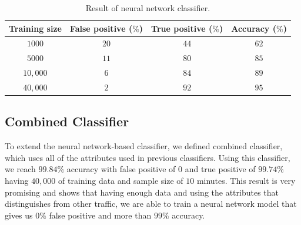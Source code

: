 \begin{table}
\center \caption{Result of neural network classifier.}\label{tab:nn}
\begin{tabular}{|c|c|c|c|}
\hline
 Training size& False positive ($\%$) &True positive ($\%$)&Accuracy ($\%$)\\
      \hline
	$1000$&$20$ &$44 $  & $62$\\
	$5000$&$11$& $80$  & $85$\\
	$10,000$&$6$& $84$  &$ 89$\\
	$40,000$&$2$& $92$   & $95$\\%

\hline
\end{tabular}
\end{table}



\subsection{Combined Classifier}
To extend the neural network-based classifier, we defined combined classifier, which uses all of the attributes used in previous classifiers. Using this classifier, we reach $99.84\%$ accuracy with false positive of $0$ and true positive of $99.74\%$ having $40,000$ of training data and sample size of $10$ minutes. This result is very promising and shows that having enough data and using the attributes that distinguishes \bc from other traffic, we are able to train a neural network model that gives us $0\%$ false positive and more than $99\%$ accuracy.


